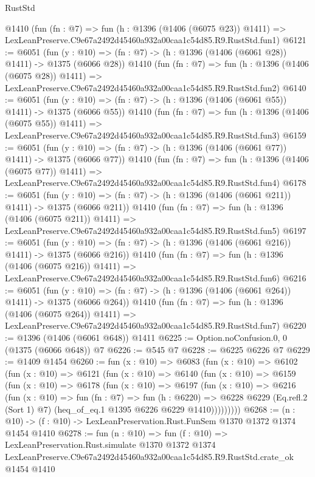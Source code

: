 \begin{lexlean}{RustStd}
\begin{coremodule}
    @1410
    (fun (fn : @7) =>
    fun (h : @1396 (@1406 (@6075 @23)) @1411) =>
    LexLeanPreserve.C9e67a2492d45460a932a00caa1c54d85.R9.RustStd.fun1)
@6121 := @6051
    (fun (y : @10) => (fn : @7) -> (h : @1396 (@1406 (@6061 @28)) @1411) -> @1375 (@6066 @28))
    @1410
    (fun (fn : @7) =>
    fun (h : @1396 (@1406 (@6075 @28)) @1411) =>
    LexLeanPreserve.C9e67a2492d45460a932a00caa1c54d85.R9.RustStd.fun2)
@6140 := @6051
    (fun (y : @10) => (fn : @7) -> (h : @1396 (@1406 (@6061 @55)) @1411) -> @1375 (@6066 @55))
    @1410
    (fun (fn : @7) =>
    fun (h : @1396 (@1406 (@6075 @55)) @1411) =>
    LexLeanPreserve.C9e67a2492d45460a932a00caa1c54d85.R9.RustStd.fun3)
@6159 := @6051
    (fun (y : @10) => (fn : @7) -> (h : @1396 (@1406 (@6061 @77)) @1411) -> @1375 (@6066 @77))
    @1410
    (fun (fn : @7) =>
    fun (h : @1396 (@1406 (@6075 @77)) @1411) =>
    LexLeanPreserve.C9e67a2492d45460a932a00caa1c54d85.R9.RustStd.fun4)
@6178 := @6051
    (fun (y : @10) => (fn : @7) -> (h : @1396 (@1406 (@6061 @211)) @1411) -> @1375 (@6066 @211))
    @1410
    (fun (fn : @7) =>
    fun (h : @1396 (@1406 (@6075 @211)) @1411) =>
    LexLeanPreserve.C9e67a2492d45460a932a00caa1c54d85.R9.RustStd.fun5)
@6197 := @6051
    (fun (y : @10) => (fn : @7) -> (h : @1396 (@1406 (@6061 @216)) @1411) -> @1375 (@6066 @216))
    @1410
    (fun (fn : @7) =>
    fun (h : @1396 (@1406 (@6075 @216)) @1411) =>
    LexLeanPreserve.C9e67a2492d45460a932a00caa1c54d85.R9.RustStd.fun6)
@6216 := @6051
    (fun (y : @10) => (fn : @7) -> (h : @1396 (@1406 (@6061 @264)) @1411) -> @1375 (@6066 @264))
    @1410
    (fun (fn : @7) =>
    fun (h : @1396 (@1406 (@6075 @264)) @1411) =>
    LexLeanPreserve.C9e67a2492d45460a932a00caa1c54d85.R9.RustStd.fun7)
@6220 := @1396 (@1406 (@6061 @648)) @1411
@6225 := Option.noConfusion.{0, 0} (@1375 (@6066 @648)) @7
@6226 := @545 @7
@6228 := @6225 @6226 @7
@6229 := @1409 @1454
@6260 := fun (x : @10) =>
  @6083
    (fun (x : @10) =>
    @6102
      (fun (x : @10) =>
      @6121
        (fun (x : @10) =>
        @6140
          (fun (x : @10) =>
          @6159
            (fun (x : @10) =>
            @6178
              (fun (x : @10) =>
              @6197
                (fun (x : @10) =>
                @6216
                  (fun (x : @10) =>
                  fun (fn : @7) =>
                  fun (h : @6220) =>
                  @6228
                    @6229
                    (Eq.refl.{2} (Sort 1) @7)
                    (heq_of_eq.{1} @1395 @6226 @6229 @1410)))))))))
@6268 := (n : @10) -> (f : @10) -> LexLeanPreservation.Rust.FunSem @1370 @1372 @1374 @1454 @1410
@6278 := fun (n : @10) =>
  fun (f : @10) =>
  LexLeanPreservation.Rust.simulate
    @1370
    @1372
    @1374
    LexLeanPreserve.C9e67a2492d45460a932a00caa1c54d85.R9.RustStd.crate_ok
    @1454
    @1410
\end{coremodule}
\end{lexlean}

